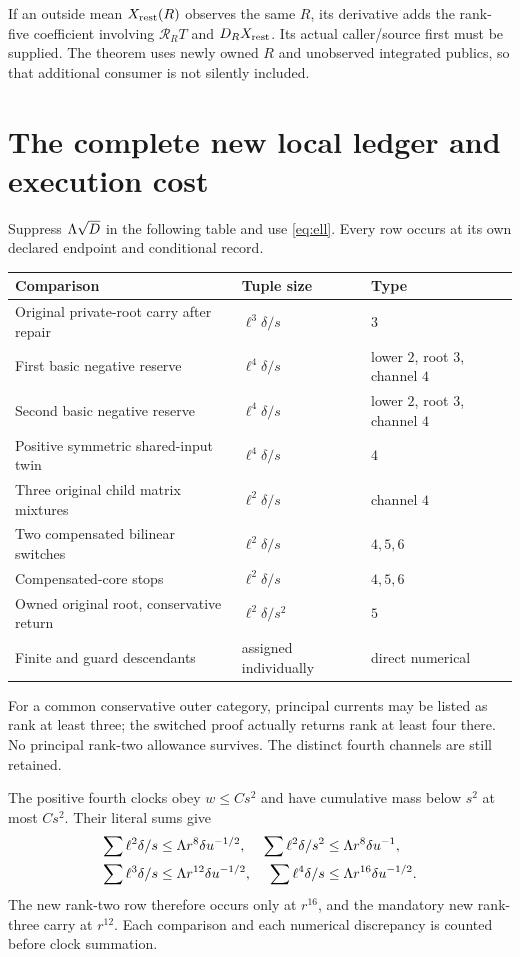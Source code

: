 \documentclass[11pt]{article}
\numberwithin{equation}{section}
\theoremstyle{remark}\newtheorem{remark}[theorem]{Remark}
\newcommand{\cR}{\mathcal R}\newcommand{\dd}{\,\mathrm d}
\begin{document}
If an outside mean $X_{\rm rest}(R)$ observes the same $R$, its derivative adds the rank-five coefficient involving $\cR_RT$ and $D_RX_{\rm rest}$. Its actual caller/source first must be supplied. The theorem uses newly owned $R$ and unobserved integrated publics, so that additional consumer is not silently included.

\section{The complete new local ledger and execution cost}
\label{sec:local-ledger}
Suppress $\Lambda\sqrt D$ in the following table and use \eqref{eq:ell}. Every row occurs at its own declared endpoint and conditional record.
\begin{center}\small
\begin{tabular}{p{}ll}
\toprule
Comparison & Tuple size & Type\\
\midrule
Original private-root carry after repair & $\ell^3\delta/s$ & $3$\\
First basic negative reserve & $\ell^4\delta/s$ & lower $2$, root $3$, channel $4$\\
Second basic negative reserve & $\ell^4\delta/s$ & lower $2$, root $3$, channel $4$\\
Positive symmetric shared-input twin & $\ell^4\delta/s$ & $4$\\
Three original child matrix mixtures & $\ell^2\delta/s$ & channel $4$\\
Two compensated bilinear switches & $\ell^2\delta/s$ & $4,5,6$\\
Compensated-core stops & $\ell^2\delta/s$ & $4,5,6$\\
Owned original root, conservative return & $\ell^2\delta/s^2$ & $5$\\
Finite and guard descendants & assigned individually & direct numerical\\
\bottomrule
\end{tabular}
\end{center}
For a common conservative outer category, principal currents may be listed as rank at least three; the switched proof actually returns rank at least four there. No principal rank-two allowance survives. The distinct fourth channels are still retained.

The positive fourth clocks obey $w\le Cs^2$ and have cumulative mass below $s^2$ at most $Cs^2$. Their literal sums give
\begin{align}\label{eq:local-sums}
 \sum\ell^2\delta/s&\le\Lambda r^8\delta u^{-1/2},&
 \sum\ell^2\delta/s^2&\le\Lambda r^8\delta u^{-1},\notag\\
 \sum\ell^3\delta/s&\le\Lambda r^{12}\delta u^{-1/2},&
 \sum\ell^4\delta/s&\le\Lambda r^{16}\delta u^{-1/2}.
\end{align}
The new rank-two row therefore occurs only at $r^{16}$, and the mandatory new rank-three carry at $r^{12}$. Each comparison and each numerical discrepancy is counted before clock summation.
\end{document}
